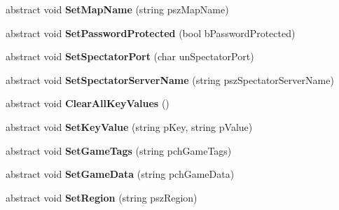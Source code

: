 \begin{DoxyCompactItemize}
abstract void {\bfseries Set\+Map\+Name} (string psz\+Map\+Name)
\item 
\mbox{\label{class_valve_1_1_steamworks_1_1_i_steam_game_server_a0c74aaa5d95cb21ac4da59bd400e5c8c}} 
abstract void {\bfseries Set\+Password\+Protected} (bool b\+Password\+Protected)
\item 
\mbox{\label{class_valve_1_1_steamworks_1_1_i_steam_game_server_a794d9336f9109ae93dd38577d88301dc}} 
abstract void {\bfseries Set\+Spectator\+Port} (char un\+Spectator\+Port)
\item 
\mbox{\label{class_valve_1_1_steamworks_1_1_i_steam_game_server_a4fc6499d8c41916965021f000b808ae7}} 
abstract void {\bfseries Set\+Spectator\+Server\+Name} (string psz\+Spectator\+Server\+Name)
\item 
\mbox{\label{class_valve_1_1_steamworks_1_1_i_steam_game_server_af81e03577fb40f96fa8c4decdcf6dd62}} 
abstract void {\bfseries Clear\+All\+Key\+Values} ()
\item 
\mbox{\label{class_valve_1_1_steamworks_1_1_i_steam_game_server_a3ae51aa9aa6d9e9783e0fdbfb7dca833}} 
abstract void {\bfseries Set\+Key\+Value} (string p\+Key, string p\+Value)
\item 
\mbox{\label{class_valve_1_1_steamworks_1_1_i_steam_game_server_a339cc816eba2a6c7d3713904097644d5}} 
abstract void {\bfseries Set\+Game\+Tags} (string pch\+Game\+Tags)
\item 
\mbox{\label{class_valve_1_1_steamworks_1_1_i_steam_game_server_a87617ebd5d15adbee0427aec449ba317}} 
abstract void {\bfseries Set\+Game\+Data} (string pch\+Game\+Data)
\item 
\mbox{\label{class_valve_1_1_steamworks_1_1_i_steam_game_server_a0f86e87d03a12fdd1e27fca7cf3c0885}} 
abstract void {\bfseries Set\+Region} (string psz\+Region)

\end{DoxyCompactItemize}
